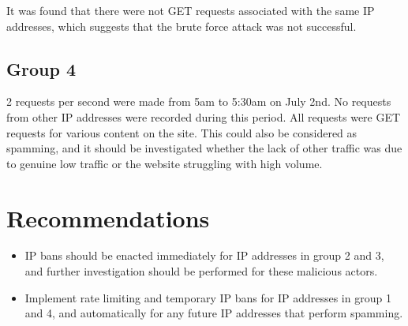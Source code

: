 \documentclass[11pt]{article}
\begin{document}
It was found that there were not GET requests associated with the same IP addresses, which suggests that the brute force attack was not successful.

\subsection{Group 4}

2 requests per second were made from 5am to 5:30am on July 2nd. No requests from other IP addresses were recorded during this period. All requests were GET requests for various content on the site. This could also be considered as spamming, and it should be investigated whether the lack of other traffic was due to genuine low traffic or the website struggling with high volume.

\section{Recommendations}

\begin{itemize}
    \item IP bans should be enacted immediately for IP addresses in group 2 and 3, and further investigation should be performed for these malicious actors.
    \item Implement rate limiting and temporary IP bans for IP addresses in group 1 and 4, and automatically for any future IP addresses that perform spamming.
\end{itemize}
\end{document}
